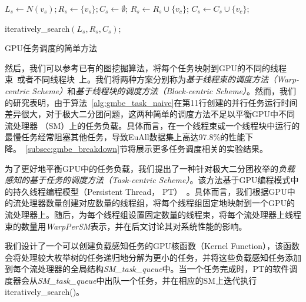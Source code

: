 \begin{algorithm} [H]
  \begin{algorithmic}[1]
    \normalsize
    
      \STATE $L_s \leftarrow N(v_s); R_s\leftarrow\{v_s\}; C_s\leftarrow \emptyset $;
          \STATE $R_s \leftarrow R_s \cup \{v_c\}$;
          \STATE $C_s \leftarrow C_s \cup \{v_c\}$;
        \ENDIF 
      \ENDFOR

        \STATE \textsf{iteratively\_search}$(L_s,R_s,C_s)$;
      \ENDIF

    \ENDFOR

  \end{algorithmic}
  \caption{GPU任务调度的简单方法}
  \label{alg:gmbe_task_naive}
\end{algorithm}


然后，我们可以参考已有的图挖掘算法，将每个任务映射到GPU的不同的线程束~\cite{g2miner22}或者不同线程块~\cite{Kclique22}上。我们将两种方案分别称为\textit{基于线程束的调度方法（Warp-centric Scheme）}和\textit{基于线程块的调度方法（Block-centric Scheme）}。然而，我们的研究表明，由于算法~\ref{alg:gmbe_task_naive}在第11行创建的并行任务运行时间差异很大，对于极大二分团问题，这两种简单的调度方法不足以平衡GPU中不同流处理器 （SM）上的任务负载。具体而言，在一个线程束或一个线程块中运行的最慢任务经常阻塞其他任务，导致EuAll数据集上高达97.8\%的性能下降。~\ref{subsec:gmbe_breakdown}节将展示更多任务调度相关的实验结果。




为了更好地平衡GPU中的任务负载，我们提出了一种针对极大二分团枚举的\textit{负载感知的基于任务的调度方法（Task-centric Scheme）}。该方法基于GPU编程模式中的持久线程编程模型（Persistent Thread， PT）~\cite{PersistentThread12}。具体而言，我们根据GPU中的流处理器数量创建对应数量的线程组，将每个线程组固定地映射到一个GPU的流处理器上。随后，为每个线程组设置固定数量的线程束，将每个流处理器上线程束的数量用\textit{WarpPerSM}表示，并在后文讨论其对系统性能的影响。



我们设计了一个可以创建负载感知任务的GPU核函数（Kernel Function），该函数会将处理较大枚举树的任务递归地分解为更小的任务，并将这些负载感知任务添加到每个流处理器的全局结构\textit{SM\_task\_queue}中。当一个任务完成时，PT的软件调度器会从\textit{SM\_task\_queue}中出队一个任务，并在相应的SM上迭代执行\textsf{}{iteratively\_search()}。

